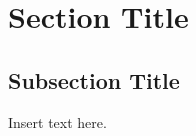 \documentclass{cheatsheet}
\author{Author Name}
\begin{document}
    \section*{Section Title}
    \subsection*{Subsection Title}
        Insert text here.
\end{document}
